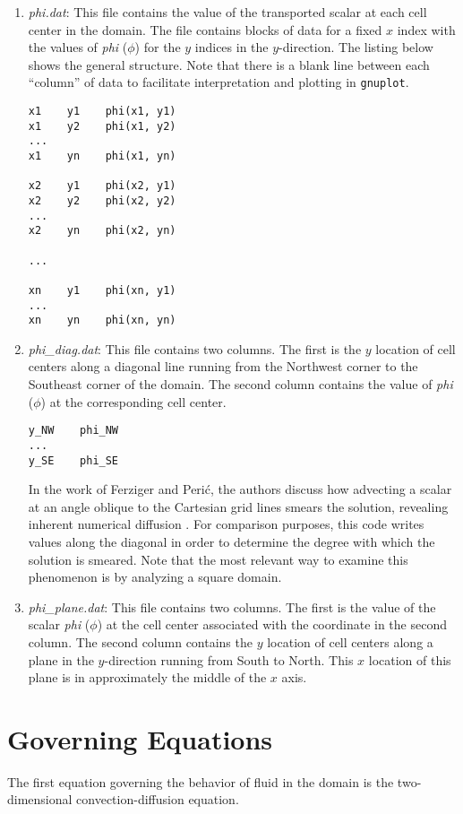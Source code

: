 \documentclass{article}
\begin{document}
\begin{enumerate}
    \item \textit{phi.dat}: This file contains the value of the transported scalar at each cell center in the domain. 
    The file contains blocks of data for a fixed $x$ index with the values of \textit{phi} ($\phi$) for the $y$ indices in the $y$-direction. 
    The listing below shows the general structure. 
    Note that there is a blank line between each ``column'' of data to facilitate interpretation and plotting in \texttt{gnuplot}.
    \begin{lstlisting}
x1    y1    phi(x1, y1)
x1    y2    phi(x1, y2)
...
x1    yn    phi(x1, yn)

x2    y1    phi(x2, y1)
x2    y2    phi(x2, y2)
...
x2    yn    phi(x2, yn)

...

xn    y1    phi(xn, y1)
...
xn    yn    phi(xn, yn)\end{lstlisting}
   \item \textit{phi\_diag.dat}: This file contains two columns. The first is the $y$ location of cell centers along a diagonal line running from the Northwest corner to the Southeast corner of the domain. 
   The second column contains the value of \textit{phi} ($\phi$) at the corresponding cell center.
   \begin{lstlisting}
y_NW    phi_NW
...
y_SE    phi_SE\end{lstlisting}
   In the work of Ferziger and Peri\'{c}, the authors discuss how advecting a scalar at an angle oblique to the Cartesian grid lines smears the solution, revealing inherent numerical diffusion \cite{fer_per}.
   For comparison purposes, this code writes values along the diagonal in order to determine the degree with which the solution is smeared.
   Note that the most relevant way to examine this phenomenon is by analyzing a square domain.
   
   \item \textit{phi\_plane.dat}: This file contains two columns. The first is the value of the scalar \textit{phi} ($\phi$) at the
   cell center associated with the coordinate in the second column. The second column contains the $y$ location of cell centers along
   a plane in the $y$-direction running from South to North. This $x$ location of this plane is in approximately the middle of the 
   $x$ axis.
\end{enumerate}


\section{Governing Equations}
The first equation governing the behavior of fluid in the domain is the two-dimensional convection-diffusion equation.
\end{document}
